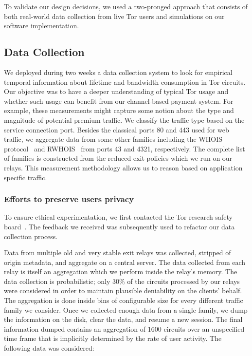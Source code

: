 To validate our design decisions, we used a two-pronged approach that consists
of both real-world data collection from live Tor users and simulations on our
software implementation.

\subsection{Data Collection}
\label{subsec:datacollection}

We deployed during two weeks a data collection system to look for empirical temporal information
about lifetime and bandwidth consumption in Tor circuits. Our objective was to
have a deeper understanding of typical Tor usage and whether such usage can
benefit from our channel-based payment system. For example, these measurements
might capture some notion about the type and magnitude of potential premium
traffic. We classify the traffic type based on the service connection
port. Besides the classical ports 80 and 443 used for web traffic, we aggregate
data from some other families including the WHOIS
protocol~\cite{daigle2004whois} and RWHOIS~\cite{williamson1994referral} from
ports 43 and 4321, respectively. The complete list of families is constructed
from the reduced exit policies which we run on our relays. This measurement
methodology allows us to reason based on application specific traffic.


\subsubsection{Efforts to preserve users privacy}

To ensure ethical experimentation, we first contacted the Tor research safety
board~\cite{torsafety}. The feedback we received was subsequently used to refactor our data
collection process.

Data from multiple old and very stable exit relays was collected, stripped of origin metadata, and
aggregate on a central server. The data collected from each relay is itself an
aggregation which we perform inside the relay's memory. The data collection is
probabilistic; only 30\% of the circuits processed by our relays were considered
in order to maintain plausible deniability on the clients' behalf. The
aggregation is done inside bins of configurable size for every different traffic
family we consider. Once we collected enough data from a single family, we dump
the information on the disk, clear the data, and resume a new session. The final
information dumped contains an aggregation of 1600 circuits over an unspecified
time frame that is implicitly determined by the rate of user activity. The
following data was considered:

